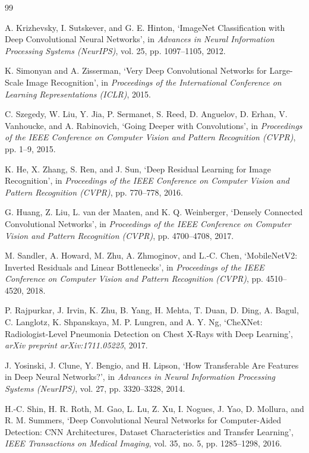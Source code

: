 \documentclass[12pt, a4paper, oneside]{report}
\begin{document}
\begin{thebibliography}{99}

A. Krizhevsky, I. Sutskever, and G. E. Hinton, `ImageNet Classification with Deep Convolutional Neural Networks', in \textit{Advances in Neural Information Processing Systems (NeurIPS)}, vol. 25, pp. 1097--1105, 2012.

K. Simonyan and A. Zisserman, `Very Deep Convolutional Networks for Large-Scale Image Recognition', in \textit{Proceedings of the International Conference on Learning Representations (ICLR)}, 2015.

C. Szegedy, W. Liu, Y. Jia, P. Sermanet, S. Reed, D. Anguelov, D. Erhan, V. Vanhoucke, and A. Rabinovich, `Going Deeper with Convolutions', in \textit{Proceedings of the IEEE Conference on Computer Vision and Pattern Recognition (CVPR)}, pp. 1--9, 2015.

K. He, X. Zhang, S. Ren, and J. Sun, `Deep Residual Learning for Image Recognition', in \textit{Proceedings of the IEEE Conference on Computer Vision and Pattern Recognition (CVPR)}, pp. 770--778, 2016.

G. Huang, Z. Liu, L. van der Maaten, and K. Q. Weinberger, `Densely Connected Convolutional Networks', in \textit{Proceedings of the IEEE Conference on Computer Vision and Pattern Recognition (CVPR)}, pp. 4700--4708, 2017.

M. Sandler, A. Howard, M. Zhu, A. Zhmoginov, and L.-C. Chen, `MobileNetV2: Inverted Residuals and Linear Bottlenecks', in \textit{Proceedings of the IEEE Conference on Computer Vision and Pattern Recognition (CVPR)}, pp. 4510--4520, 2018.

P. Rajpurkar, J. Irvin, K. Zhu, B. Yang, H. Mehta, T. Duan, D. Ding, A. Bagul, C. Langlotz, K. Shpanskaya, M. P. Lungren, and A. Y. Ng, `CheXNet: Radiologist-Level Pneumonia Detection on Chest X-Rays with Deep Learning', \textit{arXiv preprint arXiv:1711.05225}, 2017.

J. Yosinski, J. Clune, Y. Bengio, and H. Lipson, `How Transferable Are Features in Deep Neural Networks?', in \textit{Advances in Neural Information Processing Systems (NeurIPS)}, vol. 27, pp. 3320--3328, 2014.

H.-C. Shin, H. R. Roth, M. Gao, L. Lu, Z. Xu, I. Nogues, J. Yao, D. Mollura, and R. M. Summers, `Deep Convolutional Neural Networks for Computer-Aided Detection: CNN Architectures, Dataset Characteristics and Transfer Learning', \textit{IEEE Transactions on Medical Imaging}, vol. 35, no. 5, pp. 1285--1298, 2016.


\end{thebibliography}
\end{document}
